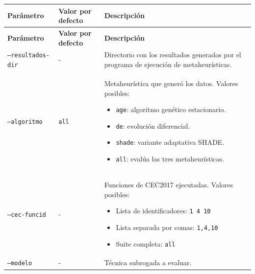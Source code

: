 \begin{longtable}[htbp]{|p{4.2cm}|p{1.8cm}|p{5.25cm}|}
    \hline
    \textbf{Parámetro} & \textbf{Valor por defecto}                                                                   & \textbf{Descripción} \\
    \hline
    \endfirsthead

    \hline
    \textbf{Parámetro} & \textbf{Valor por defecto}                                                                   & \textbf{Descripción} \\
    \hline
    \endhead

    \texttt{--resultados-dir}
                       & -
                       & Directorio con los resultados generados por el programa de ejecución de metaheurísticas.                            \\
    \hline

    \texttt{--algoritmo}
                       & \texttt{all}
                       & Metaheurística que generó los datos. Valores posibles:
    \begin{itemize}
        \setlength{\itemsep}{0pt}
        \setlength{\topsep}{2pt}
        \item \texttt{age}: algoritmo genético estacionario.
        \item \texttt{de}: evolución diferencial.
        \item \texttt{shade}: variante adaptativa SHADE.
        \item \texttt{all}: evalúa las tres metaheurísticas.
    \end{itemize}                                                                                      \\
    \hline

    \texttt{--cec-funcid}
                       & -
                       & Funciones de CEC2017 ejecutadas. Valores posibles:
    \begin{itemize}
        \setlength{\itemsep}{0pt}
        \setlength{\topsep}{2pt}
        \item Lista de identificadores: \texttt{1 4 10}
        \item Lista separada por comas: \texttt{1,4,10}
        \item Suite completa: \texttt{all}
    \end{itemize}                                                                                           \\
    \hline

    \texttt{--modelo}
                       & -
                       & Técnica subrogada a evaluar.                                                                                        \\
    \hline


\end{longtable}
